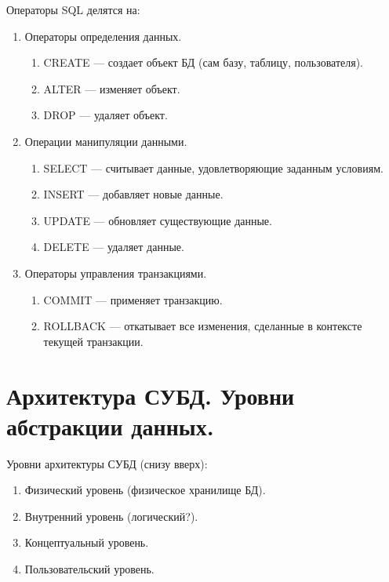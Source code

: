 \documentclass[12pt]{report}
\theoremstyle{definition}
\begin{document}
Операторы SQL делятся на:
\begin{enumerate}
\item Операторы определения данных.
  \begin{enumerate}
    \item CREATE --- создает объект БД (сам базу, таблицу, пользователя).
    \item ALTER --- изменяет объект.
    \item DROP --- удаляет объект.
  \end{enumerate}
\item Операции манипуляции данными.
  \begin{enumerate}
    \item SELECT --- считывает данные, удовлетворяющие заданным условиям.
    \item INSERT --- добавляет новые данные.
    \item UPDATE --- обновляет существующие данные.
    \item DELETE --- удаляет данные.
  \end{enumerate}
\item Операторы управления транзакциями.
  \begin{enumerate}
    \item COMMIT --- применяет транзакцию.
    \item ROLLBACK --- откатывает все изменения, сделанные в контексте текущей
      транзакции.
  \end{enumerate}
\end{enumerate}


\section{Архитектура СУБД. Уровни абстракции данных.}

Уровни архитектуры СУБД (снизу вверх):

\begin{enumerate}
\item Физический уровень (физическое хранилище БД).
\item Внутренний уровень (логический?).
\item Концептуальный уровень.
\item Пользовательский уровень.
\end{enumerate}

\end{document}
